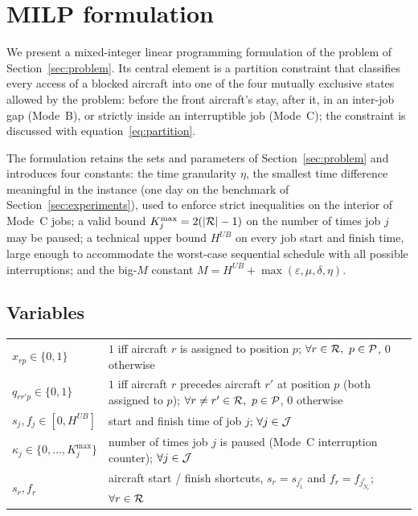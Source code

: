 \section{MILP formulation}
\label{sec:milp}

We present a mixed-integer linear programming formulation of the
problem of Section~\ref{sec:problem}.
Its central element is a partition constraint that classifies every
access of a blocked aircraft into one of the four mutually exclusive
states allowed by the problem: before the front aircraft's stay, after
it, in an inter-job gap (Mode~B), or strictly inside an interruptible
job (Mode~C); the constraint is discussed with
equation~\eqref{eq:partition}.

The formulation retains the sets and parameters of Section~\ref{sec:problem}
and introduces four constants: the time granularity $\eta$, the smallest
time difference meaningful in the instance (one day on the benchmark of
Section~\ref{sec:experiments}), used to enforce strict inequalities on the
interior of Mode~C jobs; a valid bound $K^{\max}_j = 2(|\mathcal{R}| - 1)$ on
the number of times job $j$ may be paused; a technical upper bound
$H^{UB}$ on every job start and finish time, large enough to accommodate
the worst-case sequential schedule with all possible interruptions; and
the big-$M$ constant $M = H^{UB} + \max(\varepsilon, \mu, \delta, \eta)$.

\subsection*{Variables}


\begin{tabular}{@{}l@{\quad}p{}@{}}
  $x_{rp} \in \{0,1\}$
    & $1$ iff aircraft $r$ is assigned to position $p$;
      $\forall r \in \mathcal{R},\ p \in \mathcal{P}$, 0 otherwise \\
  $q_{rr'p} \in \{0,1\}$
    & $1$ iff aircraft $r$ precedes aircraft $r'$ at position $p$
      (both assigned to $p$);
      $\forall r \ne r' \in \mathcal{R},\ p \in \mathcal{P}$, 0 otherwise\\
  $s_j, f_j \in [0, H^{UB}]$
    & start and finish time of job $j$;
      $\forall j \in \mathcal{J}$ \\
  $\kappa_j \in \{0, \ldots, K^{\max}_j\}$
    & number of times job $j$ is paused (Mode~C interruption counter);
      $\forall j \in \mathcal{J}$ \\
  $s_r, f_r$
    & aircraft start / finish shortcuts,
      $s_r = s_{j^r_1}$ and $f_r = f_{j^r_{N_r}}$;
      $\forall r \in \mathcal{R}$ \\
\end{tabular}

